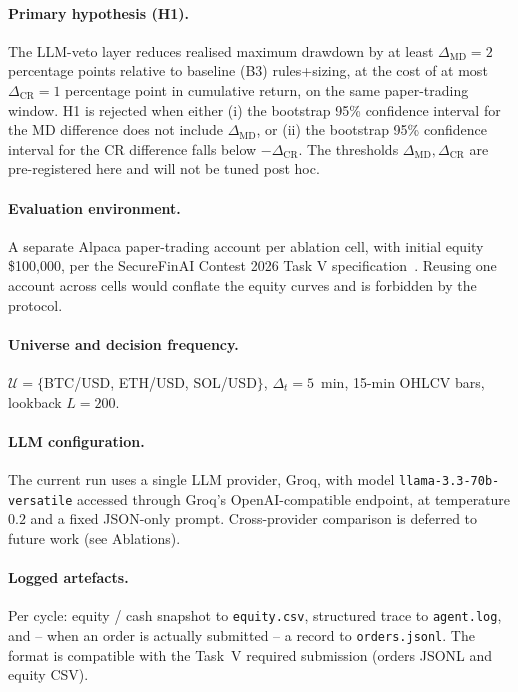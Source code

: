 \documentclass{article}
\begin{document}
\paragraph{Primary hypothesis (H1).} The LLM-veto layer reduces realised maximum drawdown by at least $\Delta_{\text{MD}} = 2$ percentage points relative to baseline (B3) rules+sizing, at the cost of at most $\Delta_{\text{CR}} = 1$ percentage point in cumulative return, on the same paper-trading window. H1 is rejected when either (i) the bootstrap 95\% confidence interval for the MD difference does not include $\Delta_{\text{MD}}$, or (ii) the bootstrap 95\% confidence interval for the CR difference falls below $-\Delta_{\text{CR}}$. The thresholds $\Delta_{\text{MD}}, \Delta_{\text{CR}}$ are pre-registered here and will not be tuned post hoc.

\paragraph{Evaluation environment.} A separate Alpaca paper-trading account per ablation cell, with initial equity \$100{,}000, per the SecureFinAI Contest 2026 Task V specification~\cite{securefinai2026}. Reusing one account across cells would conflate the equity curves and is forbidden by the protocol.

\paragraph{Universe and decision frequency.} $\mathcal{U} = \{$BTC/USD, ETH/USD, SOL/USD$\}$, $\Delta_t = 5$~min, 15-min OHLCV bars, lookback $L = 200$.

\paragraph{LLM configuration.} The current run uses a single LLM provider, Groq, with model \texttt{llama-3.3-70b-versatile} accessed through Groq\textquoteright s OpenAI-compatible endpoint, at temperature $0.2$ and a fixed JSON-only prompt. Cross-provider comparison is deferred to future work (see Ablations).

\paragraph{Logged artefacts.} Per cycle: equity / cash snapshot to \texttt{equity.csv}, structured trace to \texttt{agent.log}, and -- when an order is actually submitted -- a record to \texttt{orders.jsonl}. The format is compatible with the Task~V required submission (orders JSONL and equity CSV).
\end{document}
